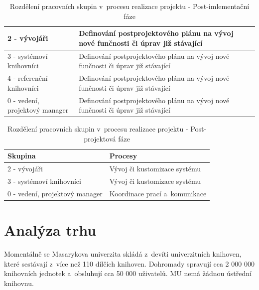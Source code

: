 \documentclass[
	11pt, oneside, printed, final, palatino, monochrome
	microtype,
	table,   %
	lof,     %
	lot     %
]{fithesis3}
\newcommand{\bold}[1]{\textbf{#1}}
\begin{document}
{\begin{table}
\begin{tabular}{| p{3cm} | p{8.3cm} |}
	2 - vývojáři
    & 
	Definování postprojektového plánu na vývoj nové funčnosti či úprav již stávající
    \\ \hline
    
	3 - systémoví knihovníci
    & 
    Definování postprojektového plánu na vývoj nové funčnosti či úprav již stávající
    \\ \hline
    
	4 - referenční knihovníci
    & 
    Definování postprojektového plánu na vývoj nové funčnosti či úprav již stávající
    \\ \hline
    
	0 - vedení, projektový manager
    & 
    Definování postprojektového plánu na vývoj nové funčnosti či úprav již stávající
    \\ \hline
    
    \end{tabular}
    \caption{Rozdělení pracovních skupin v~procesu realizace projektu - Post-imlementační fáze}
\end{table}

\begin{table}
    \centering
    \begin{tabular}{| p{3cm} | p{8.3cm} |}
    \hline
    \bold{Skupina} 	
    & 
    \bold{Procesy} 
    \\ \hline
    
	2 - vývojáři
    & 
	Vývoj či kustomizace systému
    \\ \hline
    
	3 - systémoví knihovníci
    & 
    Vývoj či kustomizace systému
    \\ \hline
    
	0 - vedení, projektový manager
    & 
    Koordinace prací a~komunikace
    \\ \hline
    
    \end{tabular}
    \caption{Rozdělení pracovních skupin v~procesu realizace projektu - Post-projektová fáze}
\end{table}

\section{Analýza trhu}
Momentálně se Masarykova univerzita skládá z~devíti univerzitních knihoven, které sestávají z~více než 110 dílčích knihoven. Dohromady spravují cca 2 000 000 knihovních jednotek a~obsluhují cca 50 000 uživatelů. MU nemá žádnou ústřední knihovnu.

}
\end{document}
